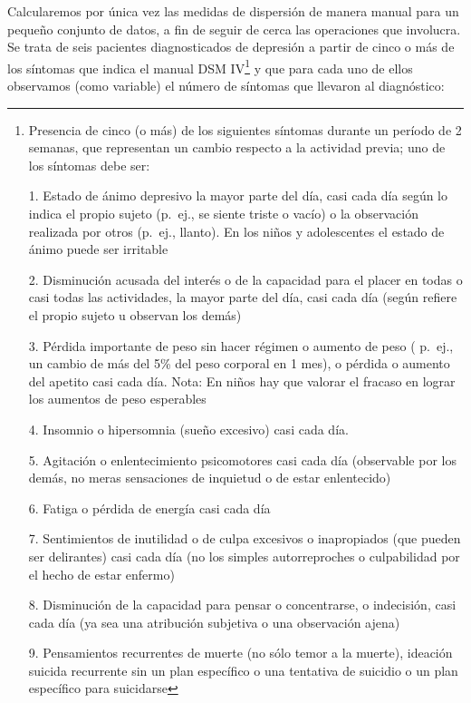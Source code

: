 \documentclass[]{book}
\let\rmarkdownfootnote\footnote%
\def\footnote{\protect\rmarkdownfootnote}
\begin{document}
Calcularemos por única vez las medidas de dispersión de manera manual
para un pequeño conjunto de datos, a fin de seguir de cerca las
operaciones que involucra. Se trata de seis pacientes diagnosticados de depresión a partir de cinco o más de los síntomas que indica el manual DSM IV\footnote{Presencia de cinco (o más) de los siguientes síntomas durante un período de 2 semanas, que representan un cambio respecto a la actividad previa; uno de los síntomas debe ser:

  1. Estado de ánimo depresivo la mayor parte del día, casi cada día según
  lo indica el propio sujeto (p.~ej., se siente triste o vacío) o la
  observación realizada por otros (p.~ej., llanto). En los niños y
  adolescentes el estado de ánimo puede ser irritable

  2. Disminución acusada del interés o de la capacidad para el placer en
  todas o casi todas las actividades, la mayor parte del día, casi cada
  día (según refiere el propio sujeto u observan los demás)

  3. Pérdida importante de peso sin hacer régimen o aumento de peso (
  p.~ej., un cambio de más del 5\% del peso corporal en 1 mes), o pérdida o
  aumento del apetito casi cada día. Nota: En niños hay que valorar el
  fracaso en lograr los aumentos de peso esperables

  4. Insomnio o hipersomnia (sueño excesivo) casi cada día.

  5. Agitación o enlentecimiento psicomotores casi cada día (observable
  por los demás, no meras sensaciones de inquietud o de estar enlentecido)

  6. Fatiga o pérdida de energía casi cada día

  7. Sentimientos de inutilidad o de culpa excesivos o inapropiados (que
  pueden ser delirantes) casi cada día (no los simples autorreproches o
  culpabilidad por el hecho de estar enfermo)

  8. Disminución de la capacidad para pensar o concentrarse, o indecisión,
  casi cada día (ya sea una atribución subjetiva o una observación ajena)

  9. Pensamientos recurrentes de muerte (no sólo temor a la muerte),
  ideación suicida recurrente sin un plan específico o una tentativa de
  suicidio o un plan específico para suicidarse} y que para cada uno de ellos observamos (como variable) el número de síntomas que llevaron al diagnóstico:
\end{document}
